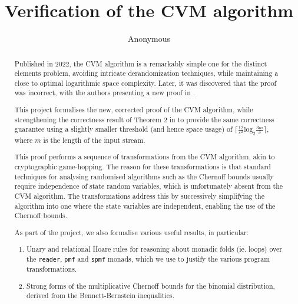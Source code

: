 \documentclass[11pt, a4paper]{report}
\begin{document}
\title{Verification of the CVM algorithm}

\author{Anonymous}

\maketitle

\begin{abstract}
  Published in 2022, the CVM algorithm \cite{cvm_2022} is a remarkably simple
  one for the distinct elements problem, avoiding intricate derandomization
  techniques, while maintaining a close to optimal logarithmic space complexity.
  Later, it was discovered that the proof was incorrect, with the authors
  presenting a new proof in \cite{cvm_2023}.

  This project formalises the new, corrected proof of the CVM algorithm, while
  strengthening the correctness result of Theorem 2 in \cite{cvm_2023} to provide
  the same correctness guarantee using a slightly smaller threshold
  (and hence space usage) of
  $\lceil \frac{12}{\varepsilon^2} \text{log}_2 \frac{3m}{\delta} \rceil$,
  where $m$ is the length of the input stream.

  This proof performs a sequence of transformations from the CVM algorithm,
  akin to cryptographic game-hopping.  The reason for these transformations is
  that standard techniques for analysing randomised algorithms such as the
  Chernoff bounds usually require independence of state random variables, which
  is unfortunately absent from the CVM algorithm.  The transformations address
  this by successively simplifying the algorithm into one where the state
  variables are independent, enabling the use of the Chernoff bounds.

  As part of the project, we also formalise various useful results, in particular:
  \begin{enumerate}
    \item Unary and relational Hoare rules for reasoning about monadic folds
    (ie. loops) over the \texttt{reader}, \texttt{pmf} and \texttt{spmf} monads,
    which we use to justify the various program transformations.

    \item Strong forms of the multiplicative Chernoff bounds for the binomial
    distribution, derived from the Bennett-Bernstein inequalities.
  \end{enumerate}
\end{abstract}

\tableofcontents
\end{document}
